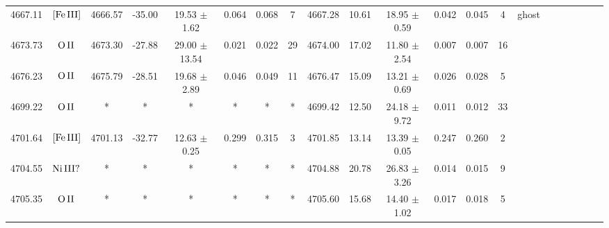 \documentclass[fleqn,usenatbib]{mnras}
\begin{document}
\begin{table*}
\begin{adjustbox}{width=\textwidth}
\begin{tabular}{ccccccccccccccccccccc}
4667.11 & $\mbox{[Fe}\thinspace \mbox{III]}$ & 4666.57 & -35.00 & 19.53 $\pm$ 1.62 & 0.064 & 0.068 & 7 & 4667.28 & 10.61 & 18.95 $\pm$ 0.59 & 0.042 & 0.045 & 4 &  ghost \\
4673.73 & $\mbox{O}\thinspace \mbox{II}$ & 4673.30 & -27.88 & 29.00 $\pm$ 13.54 & 0.021 & 0.022 & 29 & 4674.00 & 17.02 & 11.80 $\pm$ 2.54 & 0.007 & 0.007 & 16 &  \\
4676.23 & $\mbox{O}\thinspace \mbox{II}$ & 4675.79 & -28.51 & 19.68 $\pm$ 2.89 & 0.046 & 0.049 & 11 & 4676.47 & 15.09 & 13.21 $\pm$ 0.69 & 0.026 & 0.028 & 5 &  \\
4699.22 & $\mbox{O}\thinspace \mbox{II}$ & * & * & * & * & * & * & 4699.42 & 12.50 & 24.18 $\pm$ 9.72 & 0.011 & 0.012 & 33 &  \\
4701.64 & $\mbox{[Fe}\thinspace \mbox{III]}$ & 4701.13 & -32.77 & 12.63 $\pm$ 0.25 & 0.299 & 0.315 & 3 & 4701.85 & 13.14 & 13.39 $\pm$ 0.05 & 0.247 & 0.260 & 2 &  \\
4704.55 & $\mbox{Ni}\thinspace \mbox{III?}$ & * & * & * & * & * & * & 4704.88 & 20.78 & 26.83 $\pm$ 3.26 & 0.014 & 0.015 & 9 &  \\
4705.35 & $\mbox{O}\thinspace \mbox{II}$ & * & * & * & * & * & * & 4705.60 & 15.68 & 14.40 $\pm$ 1.02 & 0.017 & 0.018 & 5 &  \\
\hline
\end{tabular}
\end{adjustbox}
\end{table*}
\end{document}

